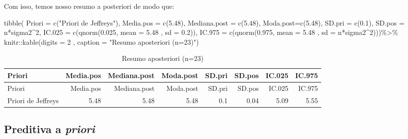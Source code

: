 \documentclass[
]{article}
\newenvironment{Shaded}{\begin{snugshade}}{\end{snugshade}}
\newcommand{\AttributeTok}[1]{\textcolor[rgb]{0.77,0.63,0.00}{#1}}
\newcommand{\DecValTok}[1]{\textcolor[rgb]{0.00,0.00,0.81}{#1}}
\newcommand{\FloatTok}[1]{\textcolor[rgb]{0.00,0.00,0.81}{#1}}
\newcommand{\FunctionTok}[1]{\textcolor[rgb]{0.00,0.00,0.00}{#1}}
\newcommand{\NormalTok}[1]{#1}
\newcommand{\SpecialCharTok}[1]{\textcolor[rgb]{0.00,0.00,0.00}{#1}}
\newcommand{\StringTok}[1]{\textcolor[rgb]{0.31,0.60,0.02}{#1}}
\begin{document}
Com isso, temos nosso resumo a posteriori de modo que:

\begin{Shaded}
\begin{Highlighting}[]
\FunctionTok{tibble}\NormalTok{(      }\AttributeTok{Priori =} \FunctionTok{c}\NormalTok{(}\StringTok{"Priori de Jeffreys"}\NormalTok{),}
             \AttributeTok{Media.pos =} \FunctionTok{c}\NormalTok{(}\FloatTok{5.48}\NormalTok{),}
             \AttributeTok{Mediana.post =} \FunctionTok{c}\NormalTok{(}\FloatTok{5.48}\NormalTok{),}
             \AttributeTok{Moda.post=}\FunctionTok{c}\NormalTok{(}\FloatTok{5.48}\NormalTok{),}
             \AttributeTok{SD.pri =} \FunctionTok{c}\NormalTok{(}\FloatTok{0.1}\NormalTok{),}
             \AttributeTok{SD.pos =}\NormalTok{ n}\SpecialCharTok{*}\NormalTok{sigma2}\SpecialCharTok{\^{}}\DecValTok{2}\NormalTok{,}
             \AttributeTok{IC.025 =} \FunctionTok{c}\NormalTok{(}\FunctionTok{qnorm}\NormalTok{(}\FloatTok{0.025}\NormalTok{, }\AttributeTok{mean =} \FloatTok{5.48}\NormalTok{ , }\AttributeTok{sd =} \FloatTok{0.2}\NormalTok{)),}
             \AttributeTok{IC.975 =} \FunctionTok{c}\NormalTok{(}\FunctionTok{qnorm}\NormalTok{(}\FloatTok{0.975}\NormalTok{, }\AttributeTok{mean =} \FloatTok{5.48}\NormalTok{ , }\AttributeTok{sd =}\NormalTok{ n}\SpecialCharTok{*}\NormalTok{sigma2}\SpecialCharTok{\^{}}\DecValTok{2}\NormalTok{)))}\SpecialCharTok{\%\textgreater{}\%}
\NormalTok{  knitr}\SpecialCharTok{::}\FunctionTok{kable}\NormalTok{(}\AttributeTok{digits =} \DecValTok{2}\NormalTok{           , }\AttributeTok{caption =} \StringTok{"Resumo aposteriori (n=23)"}\NormalTok{)}
\end{Highlighting}
\end{Shaded}

\begin{longtable}[]{@{}lrrrrrrr@{}}
\caption{Resumo aposteriori (n=23)}\tabularnewline
\toprule
Priori & Media.pos & Mediana.post & Moda.post & SD.pri & SD.pos & IC.025
& IC.975 \\
\midrule
\endfirsthead
\toprule
Priori & Media.pos & Mediana.post & Moda.post & SD.pri & SD.pos & IC.025
& IC.975 \\
\midrule
\endhead
Priori de Jeffreys & 5.48 & 5.48 & 5.48 & 0.1 & 0.04 & 5.09 & 5.55 \\
\bottomrule
\end{longtable}

\hypertarget{preditiva-a-priori}{%
\subsection{\texorpdfstring{Preditiva a
\emph{priori}}{Preditiva a priori}}\label{preditiva-a-priori}}
\end{document}
